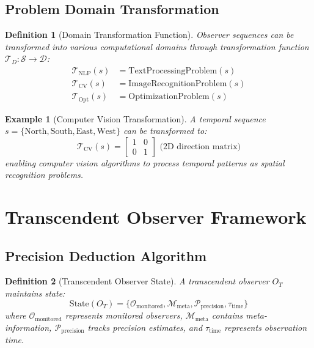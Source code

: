 \documentclass[12pt,a4paper]{article}
\newtheorem{definition}{Definition}
\newtheorem{example}{Example}
\begin{document}
\subsection{Problem Domain Transformation}

\begin{definition}[Domain Transformation Function]
Observer sequences can be transformed into various computational domains through transformation function $\mathcal{T}_D: \mathcal{S} \to \mathcal{D}$:
\begin{align}
\mathcal{T}_{\text{NLP}}(s) &= \text{TextProcessingProblem}(s) \\
\mathcal{T}_{\text{CV}}(s) &= \text{ImageRecognitionProblem}(s) \\
\mathcal{T}_{\text{Opt}}(s) &= \text{OptimizationProblem}(s)
\end{align}
\end{definition}

\begin{example}[Computer Vision Transformation]
A temporal sequence $s = \{\text{North}, \text{South}, \text{East}, \text{West}\}$ can be transformed to:
\begin{equation}
\mathcal{T}_{\text{CV}}(s) = \begin{bmatrix}
1 & 0 \\
0 & 1
\end{bmatrix} \text{ (2D direction matrix)}
\end{equation}
enabling computer vision algorithms to process temporal patterns as spatial recognition problems.
\end{example}

\section{Transcendent Observer Framework}

\subsection{Precision Deduction Algorithm}

\begin{definition}[Transcendent Observer State]
A transcendent observer $O_T$ maintains state:
\begin{equation}
\text{State}(O_T) = \{\mathcal{O}_{\text{monitored}}, \mathcal{M}_{\text{meta}}, \mathcal{P}_{\text{precision}}, \tau_{\text{time}}\}
\end{equation}
where $\mathcal{O}_{\text{monitored}}$ represents monitored observers, $\mathcal{M}_{\text{meta}}$ contains meta-information, $\mathcal{P}_{\text{precision}}$ tracks precision estimates, and $\tau_{\text{time}}$ represents observation time.
\end{definition}
\end{document}
